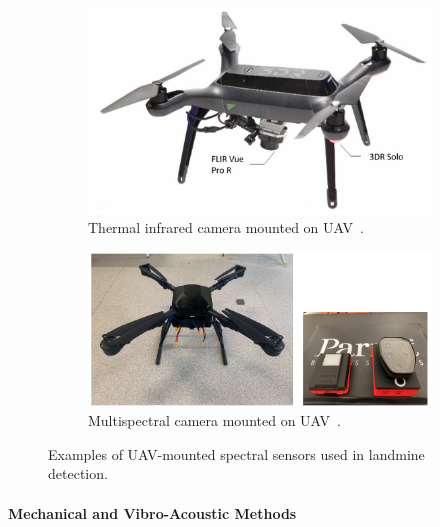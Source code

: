 \begin{figure}[h!]
    \centering
    \begin{subfigure}[b]{0.48\linewidth}
        \centering
        \includegraphics[width=\linewidth]{figs/Huirui/thermal_camera_drone.png}
        \caption{Thermal infrared camera mounted on UAV~\cite{nikulin2018detection}.}
        \label{fig:thermal_camera_drone}
    \end{subfigure}
    \hfill
    \begin{subfigure}[b]{0.48\linewidth}
        \centering
        \includegraphics[width=\linewidth]{figs/Huirui/multispectral_drone.png}
        \caption{Multispectral camera mounted on UAV~\cite{qiu2023joint}.}
        \label{fig:optical_camera_drone}
    \end{subfigure}
    \caption{Examples of UAV-mounted spectral sensors used in landmine detection.}
    \label{fig:spectral_camera_drones}
\end{figure}


\paragraph{Mechanical and Vibro-Acoustic Methods}


